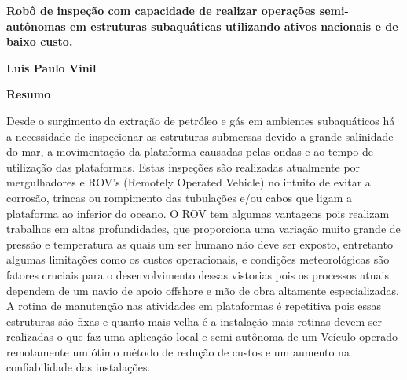 \newpage
\thispagestyle{empty}
\begin{center}
  \textbf{\Large Robô de inspeção com capacidade de realizar operações semi-autônomas em estruturas subaquáticas utilizando ativos nacionais e de baixo custo.
  }

  \vspace*{1cm}
  \textbf{\large Luis Paulo Vinil}

  \vspace*{2cm}

  \textbf{\large Resumo}
\end{center}



Desde o surgimento da extração de petróleo e gás em ambientes subaquáticos há a necessidade de inspecionar as estruturas submersas devido a grande salinidade do mar, a movimentação da plataforma causadas pelas ondas e ao tempo de utilização das plataformas. Estas inspeções são realizadas atualmente por mergulhadores e ROV's  (Remotely Operated Vehicle) no intuito de evitar a corrosão, trincas ou rompimento das tubulações e/ou cabos que ligam a plataforma ao inferior do oceano. O ROV tem algumas vantagens pois realizam trabalhos em altas profundidades, que proporciona uma variação muito grande de pressão e temperatura as quais um ser humano não deve ser exposto, entretanto algumas limitações como os custos operacionais, e condições meteorológicas são fatores cruciais para o desenvolvimento dessas vistorias pois os processos atuais dependem de um navio de apoio offshore e mão de obra altamente especializadas.
A rotina de manutenção nas atividades em plataformas é repetitiva pois essas estruturas são fixas e quanto mais velha é a instalação mais rotinas devem ser realizadas o que faz uma aplicação local e semi autônoma de um Veículo operado remotamente um ótimo método de redução de custos e um aumento na confiabilidade das instalações.

